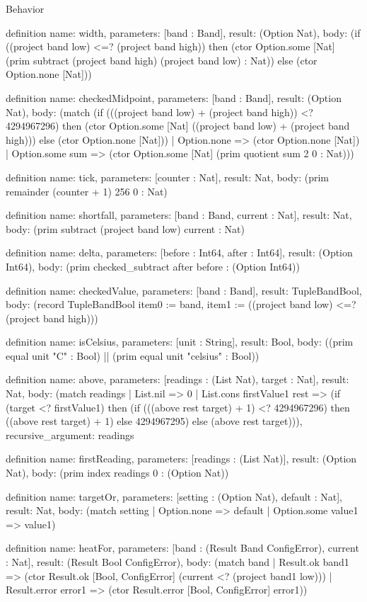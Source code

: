 \begin{lexlean}{Behavior}
\begin{semanticmodule}
definition{
  name: width,
  parameters: [band : Band],
  result: (Option Nat),
  body: (if ((project band low) <=? (project band high)) then (ctor Option.some [Nat] (prim subtract (project band high) (project band low) : Nat)) else (ctor Option.none [Nat]))
}

definition{
  name: checkedMidpoint,
  parameters: [band : Band],
  result: (Option Nat),
  body: (match (if (((project band low) + (project band high)) <? 4294967296) then (ctor Option.some [Nat] ((project band low) + (project band high))) else (ctor Option.none [Nat]))
    | Option.none => (ctor Option.none [Nat])
    | Option.some sum => (ctor Option.some [Nat] (prim quotient sum 2 0 : Nat)))
}

definition{
  name: tick,
  parameters: [counter : Nat],
  result: Nat,
  body: (prim remainder (counter + 1) 256 0 : Nat)
}

definition{
  name: shortfall,
  parameters: [band : Band, current : Nat],
  result: Nat,
  body: (prim subtract (project band low) current : Nat)
}

definition{
  name: delta,
  parameters: [before : Int64, after : Int64],
  result: (Option Int64),
  body: (prim checked_subtract after before : (Option Int64))
}

definition{
  name: checkedValue,
  parameters: [band : Band],
  result: TupleBandBool,
  body: (record TupleBandBool {item0 := band, item1 := ((project band low) <=? (project band high))})
}

definition{
  name: isCelsius,
  parameters: [unit : String],
  result: Bool,
  body: ((prim equal unit "C" : Bool) || (prim equal unit "celsius" : Bool))
}

definition{
  name: above,
  parameters: [readings : (List Nat), target : Nat],
  result: Nat,
  body: (match readings
    | List.nil => 0
    | List.cons firstValue1 rest => (if (target <? firstValue1) then (if (((above rest target) + 1) <? 4294967296) then ((above rest target) + 1) else 4294967295) else (above rest target))),
  recursive_argument: readings
}

definition{
  name: firstReading,
  parameters: [readings : (List Nat)],
  result: (Option Nat),
  body: (prim index readings 0 : (Option Nat))
}

definition{
  name: targetOr,
  parameters: [setting : (Option Nat), default : Nat],
  result: Nat,
  body: (match setting | Option.none => default | Option.some value1 => value1)
}

definition{
  name: heatFor,
  parameters: [band : (Result Band ConfigError), current : Nat],
  result: (Result Bool ConfigError),
  body: (match band
    | Result.ok band1 => (ctor Result.ok [Bool, ConfigError] (current <? (project band1 low)))
    | Result.error error1 => (ctor Result.error [Bool, ConfigError] error1))
}


\end{semanticmodule}
\end{lexlean}
